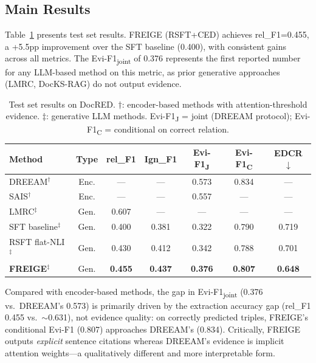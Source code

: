 \documentclass[11pt,a4paper]{article}
\newcommand{\method}{FREIGE}
\newcommand{\edcr}{EDCR}
\begin{document}
\subsection{Main Results}
\label{sec:main_results}

Table~\ref{tab:main_results} presents test set results.
\method{} (RSFT+CED) achieves rel\_F1=0.455, a +5.5pp improvement over the SFT baseline (0.400), with consistent gains across all metrics.
The Evi-F1\textsubscript{joint} of 0.376 represents the first reported number for any LLM-based method on this metric, as prior generative approaches (LMRC, DocKS-RAG) do not output evidence.

\begin{table}[t]
\centering
\small
\caption{Test set results on DocRED. $\dagger$: encoder-based methods with attention-threshold evidence. $\ddagger$: generative LLM methods. Evi-F1\textsubscript{J} = joint (DREEAM protocol); Evi-F1\textsubscript{C} = conditional on correct relation.}
\label{tab:main_results}
\begin{tabular}{@{}lcccccc@{}}
\toprule
\textbf{Method} & \textbf{Type} & \textbf{rel\_F1} & \textbf{Ign\_F1} & \textbf{Evi-F1\textsubscript{J}} & \textbf{Evi-F1\textsubscript{C}} & \textbf{\edcr{}$\downarrow$} \\
\midrule
DREEAM$^\dagger$         & Enc.  & ---   & ---   & 0.573 & 0.834 & ---   \\
SAIS$^\dagger$           & Enc.  & ---   & ---   & 0.557 & ---   & ---   \\
LMRC$^\ddagger$          & Gen.  & 0.607 & ---   & ---   & ---   & ---   \\
\midrule
SFT baseline$^\ddagger$  & Gen.  & 0.400 & 0.381 & 0.322 & 0.790 & 0.719 \\
RSFT flat-NLI$^\ddagger$ & Gen.  & 0.430 & 0.412 & 0.342 & 0.788 & 0.701 \\
\textbf{\method{}}$^\ddagger$ & Gen. & \textbf{0.455} & \textbf{0.437} & \textbf{0.376} & \textbf{0.807} & \textbf{0.648} \\
\bottomrule
\end{tabular}
\end{table}

Compared with encoder-based methods, the gap in Evi-F1\textsubscript{joint} (0.376 vs.\ DREEAM's 0.573) is primarily driven by the extraction accuracy gap (rel\_F1 0.455 vs.\ ${\sim}$0.631), not evidence quality: on correctly predicted triples, \method{}'s conditional Evi-F1 (0.807) approaches DREEAM's (0.834).
Critically, \method{} outputs \emph{explicit} sentence citations whereas DREEAM's evidence is implicit attention weights---a qualitatively different and more interpretable form.
\end{document}

